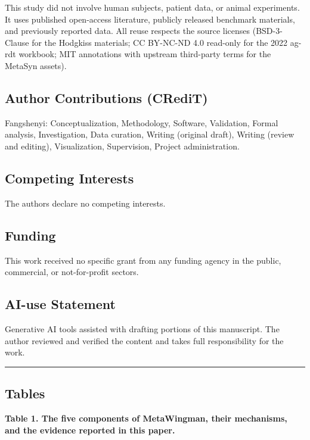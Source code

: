 \documentclass[
]{article}
\begin{document}
This study did not involve human subjects, patient data, or animal
experiments. It uses published open-access literature, publicly released
benchmark materials, and previously reported data. All reuse respects
the source licenses (BSD-3-Clause for the Hodgkiss materials; CC
BY-NC-ND 4.0 read-only for the 2022 ag-rdt workbook; MIT annotations
with upstream third-party terms for the MetaSyn assets).

\subsection{Author Contributions
(CRediT)}\label{author-contributions-credit}

Fangshenyi: Conceptualization, Methodology, Software, Validation, Formal
analysis, Investigation, Data curation, Writing (original draft),
Writing (review and editing), Visualization, Supervision, Project
administration.

\subsection{Competing Interests}\label{competing-interests}

The authors declare no competing interests.

\subsection{Funding}\label{funding}

This work received no specific grant from any funding agency in the
public, commercial, or not-for-profit sectors.

\subsection{AI-use Statement}\label{ai-use-statement}

Generative AI tools assisted with drafting portions of this manuscript.
The author reviewed and verified the content and takes full
responsibility for the work.

\begin{center}\rule{0.5\linewidth}{0.5pt}\end{center}

\subsection{Tables}\label{tables}

\textbf{Table 1. The five components of MetaWingman, their mechanisms,
and the evidence reported in this paper.}
\end{document}
